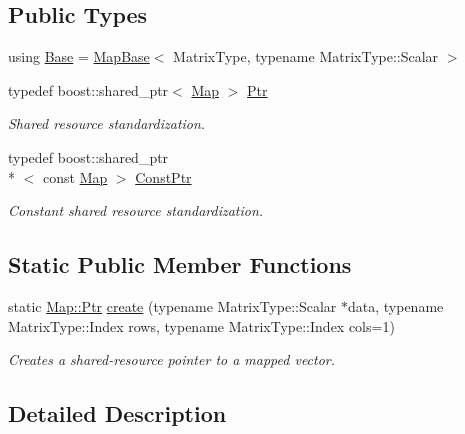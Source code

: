 \subsection*{Public Types}
\begin{DoxyCompactItemize}
\item 
using \hyperlink{structffnn_1_1aligned_1_1_map_ae7cf0913401f02f960a7addcf5bd60bf}{Base} = \hyperlink{structffnn_1_1aligned_1_1_map_base}{Map\-Base}$<$ Matrix\-Type, typename Matrix\-Type\-::\-Scalar $>$
\item 
typedef boost\-::shared\-\_\-ptr$<$ \hyperlink{structffnn_1_1aligned_1_1_map}{Map} $>$ \hyperlink{structffnn_1_1aligned_1_1_map_afe68a9534e6614c3524e95c6cdcd50fc}{Ptr}
\begin{DoxyCompactList}\small\item\em Shared resource standardization. \end{DoxyCompactList}\item 
typedef boost\-::shared\-\_\-ptr\\*
$<$ const \hyperlink{structffnn_1_1aligned_1_1_map}{Map} $>$ \hyperlink{structffnn_1_1aligned_1_1_map_ad9a5f18197cbcf6691a4ee07fa389cac}{Const\-Ptr}
\begin{DoxyCompactList}\small\item\em Constant shared resource standardization. \end{DoxyCompactList}\end{DoxyCompactItemize}
\subsection*{Static Public Member Functions}
\begin{DoxyCompactItemize}
\item 
static \hyperlink{structffnn_1_1aligned_1_1_map_afe68a9534e6614c3524e95c6cdcd50fc}{Map\-::\-Ptr} \hyperlink{structffnn_1_1aligned_1_1_map_af52aa0bd5ed9cc5e657c4694e781ebb5}{create} (typename Matrix\-Type\-::\-Scalar $\ast$data, typename Matrix\-Type\-::\-Index rows, typename Matrix\-Type\-::\-Index cols=1)
\begin{DoxyCompactList}\small\item\em Creates a shared-\/resource pointer to a mapped vector. \end{DoxyCompactList}\end{DoxyCompactItemize}


\subsection{Detailed Description}
